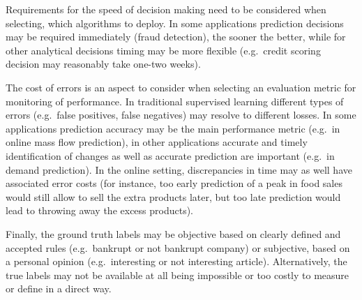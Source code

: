 \documentclass{llncs}
\begin{document}
Requirements for the speed of decision making need to be considered when selecting, which algorithms to deploy.
In some applications prediction decisions may be required immediately (fraud detection), the sooner the better,
while for other analytical decisions timing may be more flexible (e.g.\ credit scoring decision may reasonably take one-two weeks).

The cost of errors is an aspect to consider when selecting an evaluation metric for monitoring of performance.
In traditional supervised learning different types of errors (e.g.\ false positives, false negatives) may resolve to different losses.
In some applications prediction accuracy may be the main performance metric (e.g.\ in online mass flow prediction),
in other applications accurate and timely identification of changes as well as accurate prediction are important (e.g.\ in demand prediction).
In the online setting, discrepancies in time may as well have associated error costs (for instance, too early prediction of a peak in food sales would still allow to sell the extra products later, but too late prediction would lead to throwing away the excess products).

Finally, the ground truth labels may be objective based on clearly defined and accepted rules (e.g.\ bankrupt or not bankrupt company) or subjective,
based on a personal opinion (e.g.\ interesting or not interesting article). %
Alternatively, the true labels may not be available at all being impossible or too costly to measure or define in a direct way.
\end{document}

